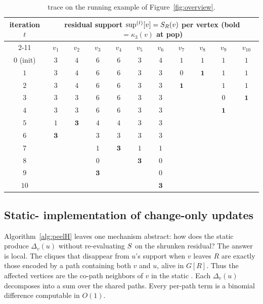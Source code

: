 \begin{table}[t]
\centering
\caption{\spinStar{} trace on the running example of Figure~\ref{fig:overview}.}
\label{tab:peel}
\tiny
\setlength{\tabcolsep}{4pt}
\begin{tabular}{c|cccccccccc}
\toprule
\multirow{2}{*}{iteration $t$} & \multicolumn{10}{c}{residual support $\mathrm{sup}^{(t)}[v]=S_R(v)$ per vertex \quad (bold $=\kappa_3(v)$ at pop)} \\
\cmidrule(lr){2-11}
                                 & $v_1$ & $v_2$ & $v_3$ & $v_4$ & $v_5$ & $v_6$ & $v_7$ & $v_8$ & $v_9$ & $v_{10}$ \\
\midrule
$0$ (init) & $3$ & $4$ & $6$ & $6$ & $3$ & $4$ & $1$ & $1$ & $1$ & $1$ \\
$1$        & $3$ & $4$ & $6$ & $6$ & $3$ & $3$ & $0$ & $\boldsymbol{1}$ & $1$ & $1$ \\
$2$        & $3$ & $4$ & $6$ & $6$ & $3$ & $3$ & $\boldsymbol{1}$ &  & $1$ & $1$ \\
$3$        & $3$ & $3$ & $6$ & $6$ & $3$ & $3$ &  &  & $0$ & $\boldsymbol{1}$ \\
$4$        & $3$ & $3$ & $6$ & $6$ & $3$ & $3$ &  &  & $\boldsymbol{1}$ &  \\
$5$        & $1$ & $\boldsymbol{3}$ & $4$ & $4$ & $3$ & $3$ &  &  &  &  \\
$6$        & $\boldsymbol{3}$ &  & $3$ & $3$ & $3$ & $3$ &  &  &  &  \\
$7$        &  &  & $1$ & $\boldsymbol{3}$ & $1$ & $1$ &  &  &  &  \\
$8$        &  &  & $0$ &  & $\boldsymbol{3}$ & $0$ &  &  &  &  \\
$9$        &  &  & $\boldsymbol{3}$ &  &  & $0$ &  &  &  &  \\
$10$       &  &  &  &  &  & $\boldsymbol{3}$ &  &  &  &  \\
\bottomrule
\end{tabular}
\end{table}

\subsection{Static-\cpi{} implementation of change-only updates}\label{sec:changeonly-impl}

Algorithm~\ref{alg:peelH} leaves one mechanism abstract: how does the static \cpi{} produce $\Delta_v(u)$ without re-evaluating $S$ on the shrunken residual?
%
The answer is local.
%
The cliques that disappear from $u$'s support when $v$ leaves $R$ are exactly those encoded by a path containing both $v$ and $u$, alive in $G[R]$.
%
Thus the affected vertices are the co-path neighbors of $v$ in the static \cpi{}.
%
Each $\Delta_v(u)$ decomposes into a sum over the shared paths.
%
Every per-path term is a binomial difference computable in $O(1)$.

